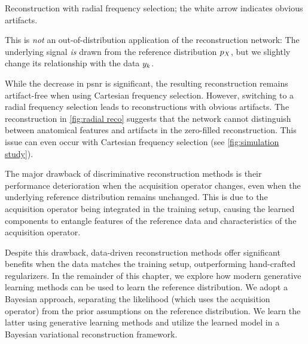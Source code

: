 \begin{sidefigure}
	\caption[Reconstruction with radial frequency selection]{Reconstruction with radial frequency selection; the white arrow indicates obvious artifacts.}
	\label{fig:radial reco}
\end{sidefigure}
This is \emph{not} an out-of-distribution application of the reconstruction network:
The underlying signal \emph{is} drawn from the reference distribution \( p_X \), but we slightly change its relationship with the data \( y_k \).

While the decrease in \gls{psnr} is significant, the resulting reconstruction remains artifact-free when using Cartesian frequency selection.
However, switching to a radial frequency selection leads to reconstructions with obvious artifacts. 
The reconstruction in \cref{fig:radial reco} suggests that the network cannot distinguish between anatomical features and artifacts in the zero-filled reconstruction.
This issue can even occur with Cartesian frequency selection (see \cref{fig:simulation study}).

The major drawback of discriminative reconstruction methods is their performance deterioration when the acquisition operator changes, even when the underlying reference distribution remains unchanged.
This is due to the acquisition operator being integrated in the training setup, causing the learned components to entangle features of the reference data and characteristics of the acquisition operator.

Despite this drawback, data-driven reconstruction methods offer significant benefits when the data matches the training setup, outperforming hand-crafted regularizers.
In the remainder of this chapter, we explore how modern generative learning methods can be used to learn the reference distribution.
We adopt a Bayesian approach, separating the likelihood (which uses the acquisition operator) from the prior assumptions on the reference distribution.
We learn the latter using generative learning methods and utilize the learned model in a Bayesian variational reconstruction framework.

